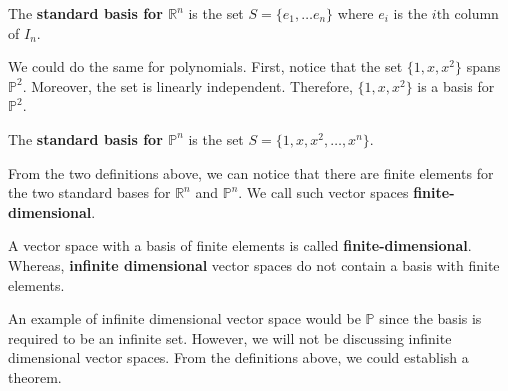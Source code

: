 \documentclass[../main.tex]{subfiles}
\begin{document}
\begin{definition}{}{}
The \textbf{standard basis for $\mathbb{R}^n$} is the set $S =
\{ e_1, \ldots e_n \}$ where $e_i$ is the $i\text{th}$ column of
$I_n$.
\end{definition}

We could do the same for polynomials. First, notice that the set
$\{ 1, x, x^2 \}$ spans $\mathbb{P}^2$. Moreover, the set is linearly
independent. Therefore, $\{ 1, x, x^2 \}$ is a basis for
$\mathbb{P}^2$.

\begin{definition}{}{}
The \textbf{standard basis for $\mathbb{P}^n$} is the set $S =
\{ 1, x, x^2, \ldots, x^n \}$.
\end{definition}

From the two definitions above, we can notice that there are finite
elements for the two standard bases for $\mathbb{R}^n$ and
$\mathbb{P}^n$. We call such vector spaces
\textbf{finite-dimensional}.

\begin{definition}{}{}
A vector space with a basis of finite elements is called
\textbf{finite-dimensional}. Whereas, \textbf{infinite dimensional}
vector spaces do not contain a basis with finite elements.
\end{definition}

An example of infinite dimensional vector space would be $\mathbb{P}$
since the basis is required to be an infinite set. However, we will
not be discussing infinite dimensional vector spaces. From the
definitions above, we could establish a theorem.
\end{document}
